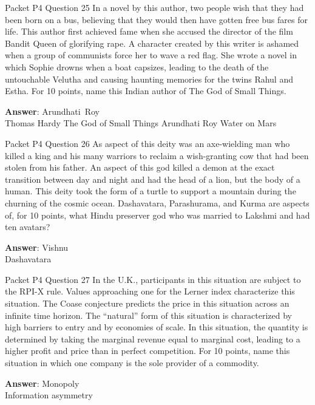 \begin{frame}{Packet P4 Question 25}
In a novel by this author, two people wish that they had been born on a bus, believing that they would then have gotten free bus fares for life. This author first achieved fame when she accused the director of the film Bandit Queen of glorifying rape. A character created by this writer is ashamed when a group of communists force her to wave a red flag. She wrote a novel in which Sophie drowns when a   boat capsizes, leading to the death of the untouchable Velutha and causing haunting memories for the   twins Rahul and Estha. For 10 points, name this Indian author of The God of Small Things.    

\textbf{Answer}: Arundhati\ Roy\\
 Thomas Hardy
 The God of Small Things
 Arundhati Roy
 Water on Mars
\end{frame}

\begin{frame}{Packet P4 Question 26}
As aspect of this deity was an axe-wielding   man who killed a king and his many warriors to reclaim a wish-granting cow that had been stolen from his father. An aspect of this god killed a demon at the exact transition between day and night and had the head of a lion, but the body of a human. This deity took the form of a turtle to support a mountain during the churning of the cosmic ocean. Dashavatara,   Parashurama, and Kurma are aspects of,   for 10 points, what Hindu preserver god     who was married to Lakshmi and had ten avatars?

\textbf{Answer}: Vishnu\\
 Dashavatara
\end{frame}

\begin{frame}{Packet P4 Question 27}
In the U.K., participants in this situation are subject to the RPI-X rule. Values approaching one for   the Lerner index characterize     this situation. The Coase conjecture predicts the price in this situation across an infinite time horizon. The ``natural'' form of this situation is characterized by high barriers   to entry and by economies of scale. In this situation, the quantity is determined by taking the marginal revenue equal to marginal cost, leading to a higher profit and price   than in perfect competition. For 10 points, name this situation in which one company is the sole provider of a commodity.

\textbf{Answer}: Monopoly\\
 Information asymmetry
\end{frame}

